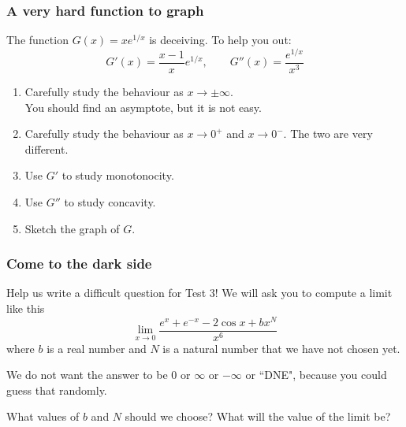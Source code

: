 \documentclass[14pt]{beamer}
\newcommand{\setsize}[1]{\fontsize{#1}{#1}\selectfont} %
\newcommand{\smallerfont}{\setsize{13}} %
\begin{document}
	\begin{frame}[t]
		\frametitle{A very hard function to graph}

		The function ${\displaystyle G(x) = x e^{1/x}}$ is deceiving. To help you out:
		\[
			G'(x) = \frac{x-1}{x}e^{1/x}, \quad \quad G''(x) = \frac{e^{1/x}}{x^{3}}
		\]

		\begin{enumerate}
			\item Carefully study the behaviour as $x \to \pm \infty$. \\ You should
				find an asymptote, but it is not easy.

			\item Carefully study the behaviour as $x \to 0^{+}$ and $x\to 0^{-}$. The
				two are very different.

			\item Use $G'$ to study monotonocity.

			\item Use $G''$ to study concavity.

			\item Sketch the graph of $G$.
		\end{enumerate}
	\end{frame}

	\begin{frame}[t]
		\smallerfont
		\frametitle{Come to the dark side}

		Help us write a difficult question for Test 3! We will ask you to compute a limit
		like this
		\[
			\lim_{x \to 0}\frac{e^{x} + e^{-x}- 2 \cos x + bx^{N}}{x^{6}}
		\]
		where $b$ is a real number and $N$ is a natural number that we have not chosen
		yet.

		\medskip We do not want the answer to be $0$ or $\infty$ or $-\infty$ or ``DNE",
		because you could guess that randomly.

		\medskip What values of $b$ and $N$ should we choose? What will the value of
		the limit be?
	\end{frame}
\end{document}
